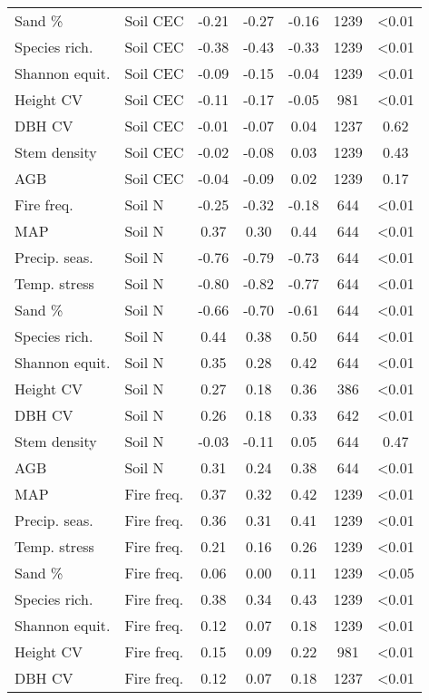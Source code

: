 \begin{longtable}{llS[table-format=-1.2]S[table-format=-1.2]S[table-format=-1.2]S[table-format=4.0]S[table-format=<1.2]}
Sand \% & Soil CEC & -0.21 & -0.27 & -0.16 & 1239 & <0.01 \\ 
Species rich. & Soil CEC & -0.38 & -0.43 & -0.33 & 1239 & <0.01 \\ 
Shannon equit. & Soil CEC & -0.09 & -0.15 & -0.04 & 1239 & <0.01 \\ 
Height CV & Soil CEC & -0.11 & -0.17 & -0.05 & 981 & <0.01 \\ 
DBH CV & Soil CEC & -0.01 & -0.07 & 0.04 & 1237 & 0.62 \\ 
Stem density & Soil CEC & -0.02 & -0.08 & 0.03 & 1239 & 0.43 \\ 
AGB & Soil CEC & -0.04 & -0.09 & 0.02 & 1239 & 0.17 \\ 
Fire freq. & Soil N & -0.25 & -0.32 & -0.18 & 644 & <0.01 \\ 
MAP & Soil N & 0.37 & 0.30 & 0.44 & 644 & <0.01 \\ 
Precip. seas. & Soil N & -0.76 & -0.79 & -0.73 & 644 & <0.01 \\ 
Temp. stress & Soil N & -0.80 & -0.82 & -0.77 & 644 & <0.01 \\ 
Sand \% & Soil N & -0.66 & -0.70 & -0.61 & 644 & <0.01 \\ 
Species rich. & Soil N & 0.44 & 0.38 & 0.50 & 644 & <0.01 \\ 
Shannon equit. & Soil N & 0.35 & 0.28 & 0.42 & 644 & <0.01 \\ 
Height CV & Soil N & 0.27 & 0.18 & 0.36 & 386 & <0.01 \\ 
DBH CV & Soil N & 0.26 & 0.18 & 0.33 & 642 & <0.01 \\ 
Stem density & Soil N & -0.03 & -0.11 & 0.05 & 644 & 0.47 \\ 
AGB & Soil N & 0.31 & 0.24 & 0.38 & 644 & <0.01 \\ 
MAP & Fire freq. & 0.37 & 0.32 & 0.42 & 1239 & <0.01 \\ 
Precip. seas. & Fire freq. & 0.36 & 0.31 & 0.41 & 1239 & <0.01 \\ 
Temp. stress & Fire freq. & 0.21 & 0.16 & 0.26 & 1239 & <0.01 \\ 
Sand \% & Fire freq. & 0.06 & 0.00 & 0.11 & 1239 & <0.05 \\ 
Species rich. & Fire freq. & 0.38 & 0.34 & 0.43 & 1239 & <0.01 \\ 
Shannon equit. & Fire freq. & 0.12 & 0.07 & 0.18 & 1239 & <0.01 \\ 
Height CV & Fire freq. & 0.15 & 0.09 & 0.22 & 981 & <0.01 \\ 
DBH CV & Fire freq. & 0.12 & 0.07 & 0.18 & 1237 & <0.01 \\ 

\end{longtable}
